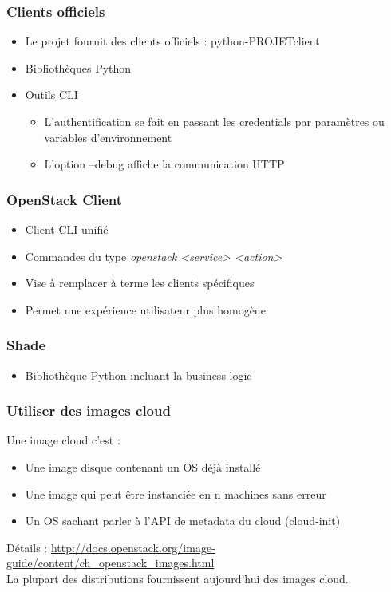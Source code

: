   \begin{frame}
    \frametitle{Clients officiels}
    \begin{itemize}
      \item Le projet fournit des clients officiels : python-PROJETclient
      \item Bibliothèques Python
      \item Outils CLI
      \begin{itemize}
        \item L'authentification se fait en passant les credentials par paramètres ou variables d'environnement
        \item L'option --debug affiche la communication HTTP
      \end{itemize}
    \end{itemize}
  \end{frame}

  \begin{frame}
    \frametitle{OpenStack Client}
    \begin{itemize}
      \item Client CLI unifié
      \item Commandes du type \textit{openstack <service> <action>}
      \item Vise à remplacer à terme les clients spécifiques
      \item Permet une expérience utilisateur plus homogène
    \end{itemize}
  \end{frame}

  \begin{frame}
    \frametitle{Shade}
    \begin{itemize}
      \item Bibliothèque Python incluant la business logic
    \end{itemize}
  \end{frame}

  \begin{frame}
    \frametitle{Utiliser des images cloud}
    Une image cloud c'est :
    \begin{itemize}
      \item Une image disque contenant un OS déjà installé
      \item Une image qui peut être instanciée en n machines sans erreur
      \item Un OS sachant parler à l'API de metadata du cloud (cloud-init)
    \end{itemize}
    Détails : \url{http://docs.openstack.org/image-guide/content/ch\_openstack\_images.html}\\
    La plupart des distributions fournissent aujourd'hui des images cloud.
  \end{frame}


